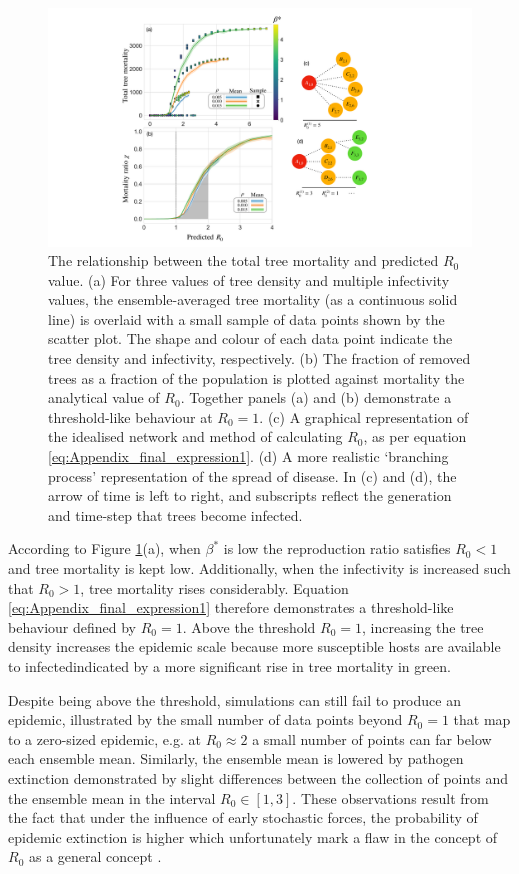 \begin{figure}
    \centering
    \includegraphics[scale=0.44]{chapter5/figures/fig4-R0-analytic-vs-mortality.pdf}
    \caption{The relationship between the total tree mortality and predicted $R_0$ value. (a) For three values of tree density and multiple infectivity values, the ensemble-averaged tree mortality (as a continuous solid line) is overlaid with a small sample of data points shown by the scatter plot. The shape and colour of each data point indicate the tree density and infectivity, respectively. (b) The fraction of removed trees as a fraction of the population is plotted against mortality the analytical value of $R_0$. Together panels (a) and (b) demonstrate a threshold-like behaviour at $R_0=1$. (c) A graphical representation of the idealised network and method of calculating $R_0$, as per equation \ref{eq:Appendix_final_expression1}. (d) A more realistic `branching process' representation of the spread of disease. In (c) and (d), the arrow of time is left to right, and subscripts reflect the generation and time-step that trees become infected.}
    \label{fig:R0-vs-NLM-sims}
\end{figure}

According to Figure \ref{fig:R0-vs-NLM-sims}(a), when $\beta^*$ is low the reproduction ratio satisfies $R_0<1$ and tree mortality is kept low.
Additionally, when the infectivity is increased such that $R_0>1$,  tree mortality rises considerably.
Equation \ref{eq:Appendix_final_expression1} therefore demonstrates a threshold-like behaviour defined by $R_0=1$.
Above the threshold $R_0=1$, increasing the tree density increases the epidemic scale because more susceptible hosts are available to infected\textemdash indicated by a more significant rise in tree mortality in green.

Despite being above the threshold, simulations can still fail to produce an epidemic,
illustrated by the small number of data points beyond $R_0=1$ that map to a zero-sized epidemic, e.g. at $R_0\approx 2$ a small number of points can far below each ensemble mean.
Similarly, the ensemble mean is lowered by pathogen extinction \textemdash demonstrated by slight differences between the collection of points and the ensemble mean in the interval $R_0 \in [1, 3]$.
These observations result from the fact that under the influence of early stochastic forces, the probability of epidemic extinction is higher \cite{perspectives-on-r0, R0-perc-ref} which unfortunately mark a flaw in the concept of $R_0$ as a general concept \cite{li2011failure}.

